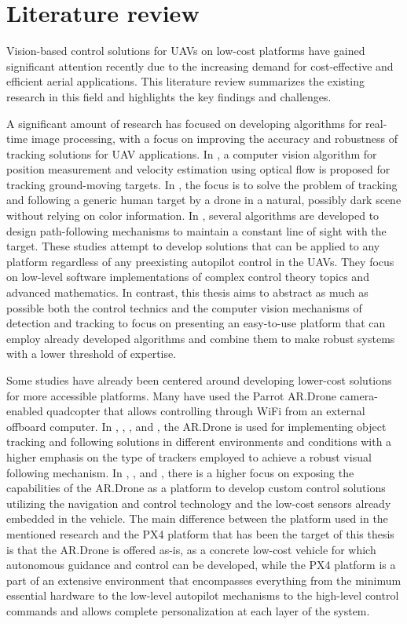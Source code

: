 \section{Literature review}
\label{sec:lit-review}

Vision-based control solutions for UAVs on low-cost platforms have gained significant attention recently due to the increasing demand for cost-effective and efficient aerial applications. This literature review summarizes the existing research in this field and highlights the key findings and challenges.

A significant amount of research has focused on developing algorithms for real-time image processing, with a focus on improving the accuracy and robustness of tracking solutions for UAV applications.
In \cite{gomez-balderas2012}, a computer
vision algorithm for position measurement and velocity estimation using optical flow is proposed for tracking ground-moving targets.
In \cite{bevilacqua2016}, the focus is to solve the problem of tracking and following a generic human target by a drone in a natural, possibly dark scene without relying on color information.
In \cite{rysdyk2003}, several algorithms are developed to design path-following mechanisms to maintain a constant line of sight with the target.
These studies attempt to develop solutions that can be applied to any platform regardless of any preexisting autopilot control in the UAVs.
They focus on low-level software implementations of complex control theory topics and advanced mathematics.
In contrast, this thesis aims to abstract as much as possible both the control technics and the computer vision mechanisms of detection and tracking to focus on presenting an easy-to-use platform that can employ already developed algorithms and combine them to make robust systems with a lower threshold of expertise.

Some studies have already been centered around developing lower-cost solutions for more accessible platforms. Many have used the Parrot AR.Drone camera-enabled quadcopter that allows controlling through WiFi from an external offboard computer.
In \cite{bartak2015}, \cite{chakrabarty2016}, \cite{pestana2013}, and \cite{haag2015}, the AR.Drone is used for implementing object tracking and following solutions in different environments and conditions with a higher emphasis on the type of trackers employed to achieve a robust visual following mechanism.
In \cite{hernandez2013}, \cite{lugo2014}, and \cite{bristeau2011}, there is a higher focus on exposing the capabilities of the AR.Drone as a platform to develop custom control solutions utilizing the navigation and control technology and the low-cost sensors already embedded in the vehicle.
The main difference between the platform used in the mentioned research and the PX4 platform that has been the target of this thesis is that the AR.Drone is offered as-is, as a concrete low-cost vehicle for which autonomous guidance and control can be developed, while the PX4 platform is a part of an extensive environment that encompasses everything from the minimum essential hardware to the low-level autopilot mechanisms to the high-level control commands and allows complete personalization at each layer of the system.

